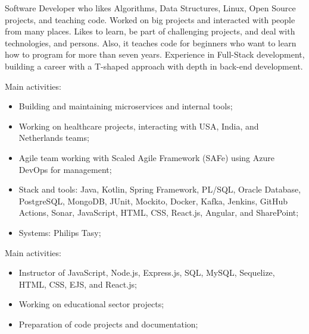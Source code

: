 \documentclass[10pt,a4paper,ragged2e,withhyper]{assets/class/altacv}
\begin{document}



\makecvheader


\begin{paracol}{2}


  Software Developer who likes Algorithms, Data Structures, Linux, Open Source projects, and teaching code. Worked on big projects and interacted with people from many places. Likes to learn, be part of challenging projects, and deal with technologies, and persons. Also, it teaches code for beginners who want to learn how to program for more than seven years. Experience in Full-Stack development, building a career with a T-shaped approach with depth in back-end development.

  \medskip


  Main activities:
  \begin{itemize}
    \item Building and maintaining microservices and internal tools;
    \item Working on healthcare projects, interacting with USA, India, and Netherlands teams;
    \item Agile team working with Scaled Agile Framework (SAFe) using Azure DevOps for management;
    \item Stack and tools: Java, Kotlin, Spring Framework, PL/SQL, Oracle Database, PostgreSQL, MongoDB, JUnit, Mockito, Docker, Kafka, Jenkins, GitHub Actions, Sonar, JavaScript, HTML, CSS, React.js, Angular, and SharePoint;
    \item Systems: Philips Tasy;
  \end{itemize}

  \divider

  Main activities:
  \begin{itemize}
    \item Instructor of JavaScript, Node.js, Express.js, SQL, MySQL, Sequelize, HTML, CSS, EJS, and React.js;
    \item Working on educational sector projects;
    \item Preparation of code projects and documentation;
  \end{itemize}


\end{paracol}
\end{document}
